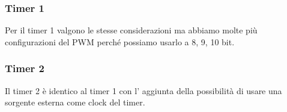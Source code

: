\subsubsection{Timer 1}
Per il timer 1 valgono le stesse considerazioni ma abbiamo molte più configurazioni del PWM perché possiamo usarlo a 8, 9, 10 bit.

\subsubsection{Timer 2}
Il timer 2 è identico al timer 1 con l' aggiunta della possibilità di usare una sorgente esterna come clock del timer.

